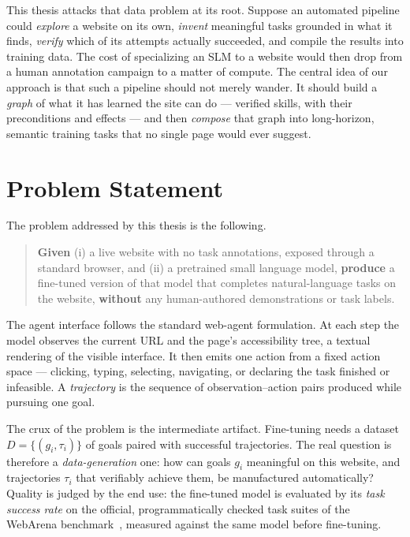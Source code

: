 This thesis attacks that data problem at its root. Suppose an automated
pipeline could \emph{explore} a website on its own, \emph{invent} meaningful
tasks grounded in what it finds, \emph{verify} which of its attempts actually
succeeded, and compile the results into training data. The cost of
specializing an SLM to a website would then drop from a human annotation
campaign to a matter of compute. The central idea of our approach is that
such a pipeline should not merely wander. It should build a \emph{graph} of
what it has learned the site can do --- verified skills, with their
preconditions and effects --- and then \emph{compose} that graph into
long-horizon, semantic training tasks that no single page would ever suggest.

\section{Problem Statement}
\label{sec:intro-problem}

The problem addressed by this thesis is the following.

\begin{quote}
\textbf{Given} (i) a live website with no task annotations, exposed through a
standard browser, and (ii) a pretrained small language model,
\textbf{produce} a fine-tuned version of that model that completes
natural-language tasks on the website, \textbf{without} any human-authored
demonstrations or task labels.
\end{quote}

The agent interface follows the standard web-agent formulation. At each step
the model observes the current URL and the page's accessibility tree, a
textual rendering of the visible interface. It then emits one action from a
fixed action space --- clicking, typing, selecting, navigating, or declaring
the task finished or infeasible. A \emph{trajectory} is the sequence of
observation--action pairs produced while pursuing one goal.

The crux of the problem is the intermediate artifact. Fine-tuning needs a
dataset $D = \{(g_i, \tau_i)\}$ of goals paired with successful trajectories.
The real question is therefore a \emph{data-generation} one: how can goals
$g_i$ meaningful on this website, and trajectories $\tau_i$ that verifiably
achieve them, be manufactured automatically? Quality is judged by the end
use: the fine-tuned model is evaluated by its \emph{task success rate} on the
official, programmatically checked task suites of the WebArena
benchmark~\cite{zhou2024webarena}, measured against the same model before
fine-tuning.

